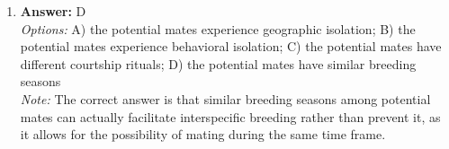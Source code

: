 \documentclass[12pt]{article}
\begin{document}
\begin{enumerate}[label=\arabic*.]
\\ \textit{Note:} Milk spoils in the refrigerator primarily due to enzymatic reactions facilitated by residual enzymes and microbial activity, which can still occur at lower temperatures, leading to the breakdown of proteins and fats when exposed to oxygen.
\item \textbf{Answer:} D
\\ \textit{Options:} A) the potential mates experience geographic isolation; B) the potential mates experience behavioral isolation; C) the potential mates have different courtship rituals; D) the potential mates have similar breeding seasons
\\ \textit{Note:} The correct answer is that similar breeding seasons among potential mates can actually facilitate interspecific breeding rather than prevent it, as it allows for the possibility of mating during the same time frame.
\end{enumerate}
\end{document}
